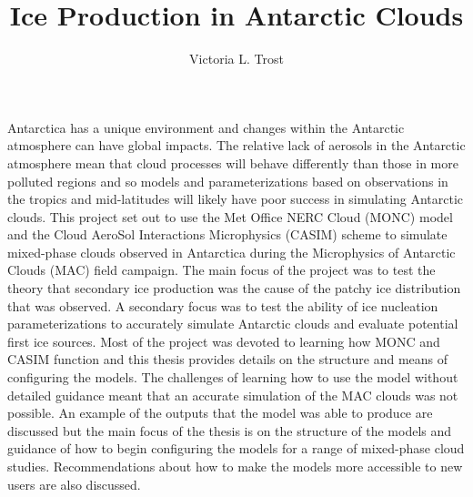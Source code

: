 \documentclass[12pt,PhD,twoside]{muthesis}
\numberwithin{equation}{chapter}														 %
\begin{document}
	
\title{Ice Production in Antarctic Clouds}
\author{Victoria L. Trost}
\def\wordcount{39,185}

\beforeabstract

	Antarctica has a unique environment and changes within the Antarctic atmosphere can have global impacts. The relative lack of aerosols in the Antarctic atmosphere mean that cloud processes will behave differently than those in more polluted regions and so models and parameterizations based on observations in the tropics and mid-latitudes will likely have poor success in simulating Antarctic clouds. This project set out to use the Met Office NERC Cloud (MONC) model and the Cloud AeroSol Interactions Microphysics (CASIM) scheme to simulate mixed-phase clouds observed in Antarctica during the Microphysics of Antarctic Clouds (MAC) field campaign. The main focus of the project was to test the theory that secondary ice production was the cause of the patchy ice distribution that was observed. A secondary focus was to test the ability of ice nucleation parameterizations to accurately simulate Antarctic clouds and evaluate potential first ice sources. Most of the project was devoted to learning how MONC and CASIM function and this thesis provides details on the structure and means of configuring the models. The challenges of learning how to use the model without detailed guidance meant that an accurate simulation of the MAC clouds was not possible. An example of the outputs that the model was able to produce are discussed but the main focus of the thesis is on the structure of the models and guidance of how to begin configuring the models for a range of mixed-phase cloud studies. Recommendations about how to make the models more accessible to new users are also discussed.
\end{document}
